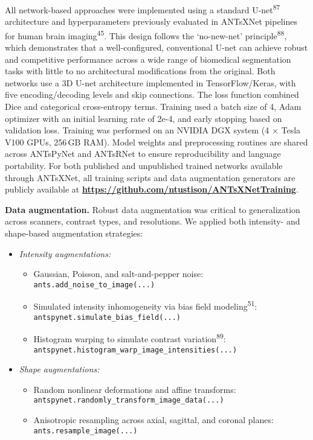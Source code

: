 \documentclass[
  12pt,
]{article}
\providecommand{\tightlist}{%
  \setlength{\itemsep}{0pt}\setlength{\parskip}{0pt}}
\begin{document}
All network-based approaches were implemented using a standard
U-net\textsuperscript{87} architecture and hyperparameters previously
evaluated in ANTsXNet pipelines for human brain
imaging\textsuperscript{45}. This design follows the `no-new-net'
principle\textsuperscript{88}, which demonstrates that a
well-configured, conventional U-net can achieve robust and competitive
performance across a wide range of biomedical segmentation tasks with
little to no architectural modifications from the original. Both
networks use a 3D U-net architecture implemented in TensorFlow/Keras,
with five encoding/decoding levels and skip connections. The loss
function combined Dice and categorical cross-entropy terms. Training
used a batch size of 4, Adam optimizer with an initial learning rate of
2e-4, and early stopping based on validation loss. Training was
performed on an NVIDIA DGX system (4 \(\times\) Tesla V100 GPUs, 256\,GB
RAM). Model weights and preprocessing routines are shared across
ANTsPyNet and ANTsRNet to ensure reproducibility and language
portability. For both published and unpublished trained networks
available through ANTsXNet, all training scripts and data augmentation
generators are publicly available at
\textbf{\url{https://github.com/ntustison/ANTsXNetTraining}}.

\textbf{Data augmentation.} Robust data augmentation was critical to
generalization across scanners, contrast types, and resolutions. We
applied both intensity- and shape-based augmentation strategies:

\begin{itemize}
\item
  \emph{Intensity augmentations:}

  \begin{itemize}
  \tightlist
  \item
    Gaussian, Poisson, and salt-and-pepper noise:\\
    \texttt{ants.add\_noise\_to\_image(...)}
  \item
    Simulated intensity inhomogeneity via bias field
    modeling\textsuperscript{51}:\\
    \texttt{antspynet.simulate\_bias\_field(...)}
  \item
    Histogram warping to simulate contrast
    variation\textsuperscript{89}:\\
    \texttt{antspynet.histogram\_warp\_image\_intensities(...)}
  \end{itemize}
\item
  \emph{Shape augmentations:}

  \begin{itemize}
  \tightlist
  \item
    Random nonlinear deformations and affine transforms:\\
    \texttt{antspynet.randomly\_transform\_image\_data(...)}
  \item
    Anisotropic resampling across axial, sagittal, and coronal planes:\\
    \texttt{ants.resample\_image(...)}
  \end{itemize}
\end{itemize}
\end{document}
